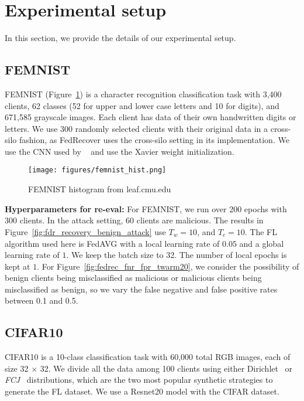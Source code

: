 \section{Experimental setup}\label{sec:setup}
In this section, we provide the details of our experimental setup.

\subsection{FEMNIST~\cite{caldas2018leaf,cohen2017emnist}}\label{setup:femnist}
FEMNIST (Figure~\ref{fig:femnist_hist}) is a character recognition classification task with 3,400 clients, 62 classes (52 for upper and lower case letters and 10 for digits), and 671,585  grayscale images. 
Each client has data of their own handwritten digits or letters. We use 300 randomly selected clients with their original data in a cross-silo fashion, as FedRecover uses the cross-silo setting in its implementation.
We use the CNN used by ~\cite{cao2022fedrecover} and use the Xavier weight initialization.


\begin{figure}[t]
\centering
\texttt{[image: figures/femnist\_hist.png]}
\vspace{-0.55cm}
\caption{FEMNIST histogram from leaf.cmu.edu}
\label{fig:femnist_hist}
\vspace{-0.3cm}
\end{figure}

\noindent\textbf{Hyperparameters for re-eval:} For FEMNIST, we run over 200 epochs with 300 clients. In the attack setting, 60 clients are malicious. The results in Figure~\ref{fig:fdr_recovery_benign_attack} use $T_w=10$, and $T_c=10$. The FL algorithm used here is FedAVG with a local learning rate of $0.05$ and a global learning rate of $1$. We keep the batch size to 32. The number of local epochs is kept at $1$. For Figure~\ref{fig:fedrec_fnr_fpr_twarm20}, we consider the possibility of benign clients being misclassified as malicious or malicious clients being misclassified as benign, so we vary the false negative and false positive rates between 0.1 and 0.5. 

\subsection{CIFAR10~\cite{Krizhevsky2009learning}}\label{setup:cifar10}
CIFAR10 is a 10-class classification task with 60,000 total RGB images, each of size 32 $\times$ 32. We divide all the data among 100 clients using either Dirichlet~\cite{reddi2020adaptive} or \emph{FCJ}~\cite{fang2020local} distributions, which are the two most popular synthetic strategies to generate the FL dataset. We use a Resnet20 model with the CIFAR dataset.

